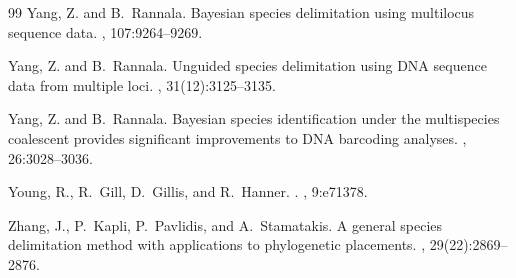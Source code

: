 \documentclass[12pt]{article}
\begin{document}
\begin{thebibliography}{99}
Yang, Z. and B.~Rannala\leavevmode\nopagebreak{}.
\newblock Bayesian species delimitation using multilocus sequence data.
,
  107:9264--9269.

Yang, Z. and B.~Rannala\leavevmode\nopagebreak{}.
\newblock Unguided species delimitation using {DNA} sequence data from multiple
  loci.
, 31(12):3125--3135.

Yang, Z. and B.~Rannala\leavevmode\nopagebreak{}.
\newblock Bayesian species identification under the multispecies coalescent
  provides significant improvements to {DNA} barcoding analyses.
, 26:3028--3036.

Young, R., R.~Gill, D.~Gillis, and R.~Hanner\leavevmode\nopagebreak{}.
.
, 9:e71378.

Zhang, J., P.~Kapli, P.~Pavlidis, and
  A.~Stamatakis\leavevmode\nopagebreak{}.
\newblock A general species delimitation method with applications to
  phylogenetic placements.
, 29(22):2869--2876.

\end{thebibliography}


%
%

\newpage
\end{document}
